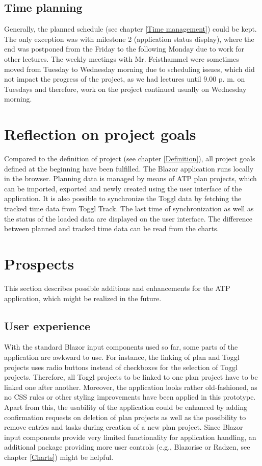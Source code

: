 \subsection{Time planning}
Generally, the planned schedule (see chapter \ref{Time management}) could be kept. The only exception was with milestone 2 (application status display), where the end was postponed from the Friday to the following Monday due to work for other lectures. The weekly meetings with Mr. Feisthammel were sometimes moved from Tuesday to Wednesday morning due to scheduling issues, which did not impact the progress of the project, as we had lectures until 9.00 p. m. on Tuesdays and therefore, work on the project continued usually on Wednesday morning.

\section{Reflection on project goals}
Compared to the definition of project (see chapter \ref{Definition}), all project goals defined at the beginning have been fulfilled. The Blazor application runs locally in the browser. Planning data is managed by means of ATP plan projects, which can be imported, exported and newly created using the user interface of the application. It is also possible to synchronize the Toggl data by fetching the tracked time data from Toggl Track. The last time of synchronization as well as the status of the loaded data are displayed on the user interface. The difference between planned and tracked time data can be read from the charts.

\section{Prospects}
This section describes possible additions and enhancements for the ATP application, which might be realized in the future.

\subsection{User experience}
With the standard Blazor input components used so far, some parts of the application are awkward to use. For instance, the linking of plan and Toggl projects uses radio buttons instead of checkboxes for the selection of Toggl projects. Therefore, all Toggl projects to be linked to one plan project have to be linked one after another. Moreover, the application looks rather old-fashioned, as no CSS rules or other styling improvements have been applied in this prototype. Apart from this, the usability of the application could be enhanced by adding confirmation requests on deletion of plan projects as well as the possibility to remove entries and tasks during creation of a new plan project. Since Blazor input components provide very limited functionality for application handling, an additional package providing more user controls (e.g., Blazorise or Radzen, see chapter \ref{Charts}) might be helpful.

